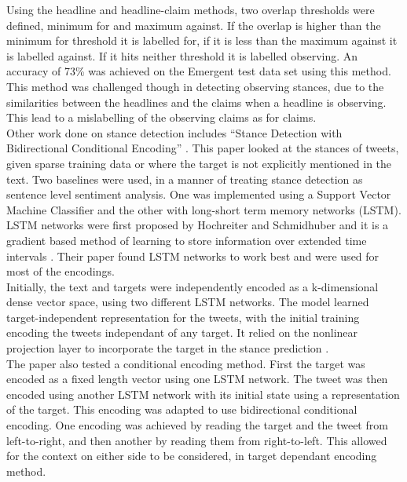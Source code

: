 \documentclass[11pt,a4paper]{article}
\begin{document}
Using the headline and headline-claim methods, two overlap thresholds were defined, minimum for and maximum against. If the overlap is higher than the minimum for threshold it is labelled for, if it is less than the maximum against it is labelled against. If it hits neither threshold it is labelled observing. An accuracy of 73\% was achieved on the Emergent test data set using this method. This method was challenged though in detecting observing stances, due to the similarities between the headlines and the claims when a headline is observing. This lead to a mislabelling of the observing claims as for claims. \\

Other work done on stance detection includes “Stance Detection with Bidirectional Conditional Encoding” \cite{augenstein2016stance}. This paper looked at the stances of tweets, given sparse training data or where the target is not explicitly mentioned in the text. Two baselines were used, in a manner of treating stance detection as sentence level sentiment analysis. One was implemented using a Support Vector Machine Classifier and the other with long-short term memory networks (LSTM). LSTM networks were first proposed by Hochreiter and Schmidhuber and it is a gradient based method of learning to store information over extended time intervals \cite{hochreiter1997long}. Their paper found LSTM networks to work best and were used for most of the encodings. \\

Initially, the text and targets were independently encoded as a k-dimensional dense vector space, using two different LSTM networks. The model learned target-independent representation for the tweets, with the initial training encoding the tweets independant of any target. It relied on the nonlinear projection layer to incorporate the target in the stance prediction \cite{augenstein2016stance}. \\

The paper also tested a conditional encoding method. First the target was encoded as a fixed length vector using one LSTM network. The tweet was then encoded using another LSTM network with its initial state using a representation of the target. This encoding was adapted to use bidirectional conditional encoding. One encoding was achieved by reading the target and the tweet from left-to-right, and then another by reading them from right-to-left. This allowed for the context on either side to be considered, in target dependant encoding method. \\
\end{document}

